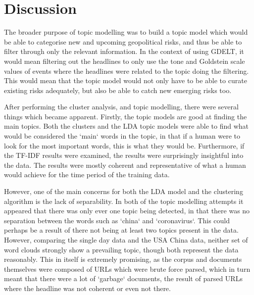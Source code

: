 \section{Discussion}
\label{discussion}
The broader purpose of topic modelling was to build a topic model which would be able to categorise new and upcoming geopolitical risks, and thus be able to filter through only the relevant information. In the context of using GDELT, it would mean filtering out the headlines to only use the tone and Goldstein scale values of events where the headlines were related to the topic doing the filtering. This would mean that the topic model would not only have to be able to curate existing risks adequately, but also be able to catch new emerging risks too.

After performing the cluster analysis, and topic modelling, there were several things which became apparent. Firstly, the topic models are good at finding the main topics. Both the clusters and the LDA topic models were able to find what would be considered the `main` words in the topic, in that if a human were to look for the most important words, this is what they would be. Furthermore, if the TF-IDF results were examined, the results were surprisingly insightful into the data. The results were mostly coherent and representative of what a human would achieve for the time period of the training data.

However, one of the main concerns for both the LDA model and the clustering algorithm is the lack of separability. In both of the topic modelling attempts it appeared that there was only ever one topic being detected, in that there was no separation between the words such as `china` and `coronavirus`. This could perhaps be a result of there not being at least two topics present in the data. However, comparing the single day data and the USA China data, neither set of word clouds strongly show a prevailing topic, though both represent the data reasonably. This in itself is extremely promising, as the corpus and documents themselves were composed of URLs which were brute force parsed, which in turn meant that there were a lot of `garbage` documents, the result of parsed URLs where the headline was not coherent or even not there.

